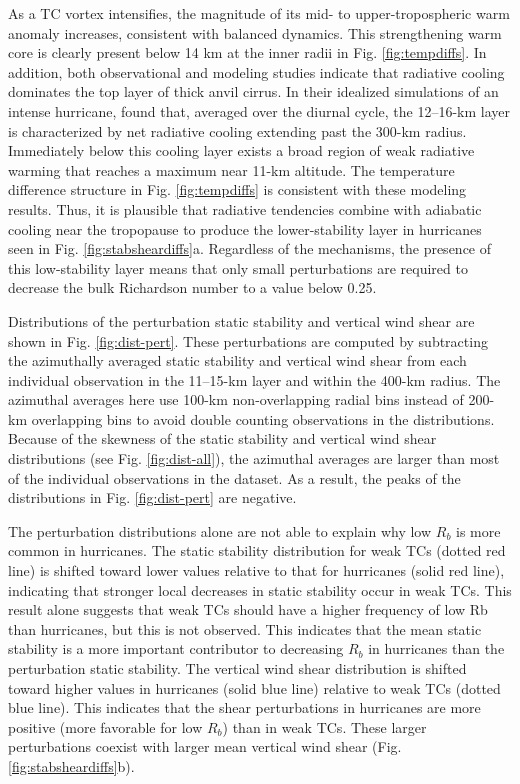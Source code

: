 As a TC vortex intensifies, the magnitude of its mid- to upper-tropospheric warm anomaly increases, consistent with balanced dynamics.
This strengthening warm core is clearly present below 14 km at the inner radii in Fig. \ref{fig:tempdiffs}.
In addition, both observational \citep{Garrettetal2005} and modeling \citep{Buetal2014} studies indicate that radiative cooling dominates the top layer of thick anvil cirrus.
In their idealized simulations of an intense hurricane, \cite{Buetal2014} found that, averaged over the diurnal cycle, the 12--16-km layer is characterized by net radiative cooling extending past the 300-km radius.
Immediately below this cooling layer exists a broad region of weak radiative warming that reaches a maximum near 11-km altitude.
The temperature difference structure in Fig. \ref{fig:tempdiffs} is consistent with these modeling results.
Thus, it is plausible that radiative tendencies combine with adiabatic cooling near the tropopause to produce the lower-stability layer in hurricanes seen in Fig. \ref{fig:stabsheardiffs}a.
Regardless of the mechanisms, the presence of this low-stability layer means that only small perturbations are required to decrease the bulk Richardson number to a value below 0.25.

Distributions of the perturbation static stability and vertical wind shear are shown in Fig. \ref{fig:dist-pert}.
These perturbations are computed by subtracting the azimuthally averaged static stability and vertical wind shear from each individual observation in the 11–15-km layer and within the 400-km radius.
The azimuthal averages here use 100-km non-overlapping radial bins instead of 200-km overlapping bins to avoid double counting observations in the distributions.
Because of the skewness of the static stability and vertical wind shear distributions (see Fig. \ref{fig:dist-all}), the azimuthal averages are larger than most of the individual observations in the dataset.
As a result, the peaks of the distributions in Fig. \ref{fig:dist-pert} are negative.

The perturbation distributions alone are not able to explain why low $R_b$ is more common in hurricanes.
The static stability distribution for weak TCs (dotted red line) is shifted toward lower values relative to that for hurricanes (solid red line), indicating that stronger local decreases in static stability occur in weak TCs.
This result alone suggests that weak TCs should have a higher frequency of low Rb than hurricanes, but this is not observed.
This indicates that the mean static stability is a more important contributor to decreasing $R_b$ in hurricanes than the perturbation static stability.
The vertical wind shear distribution is shifted toward higher values in hurricanes (solid blue line) relative to weak TCs (dotted blue line).
This indicates that the shear perturbations in hurricanes are more positive (more favorable for low $R_b$) than in weak TCs.
These larger perturbations coexist with larger mean vertical wind shear (Fig. \ref{fig:stabsheardiffs}b).

